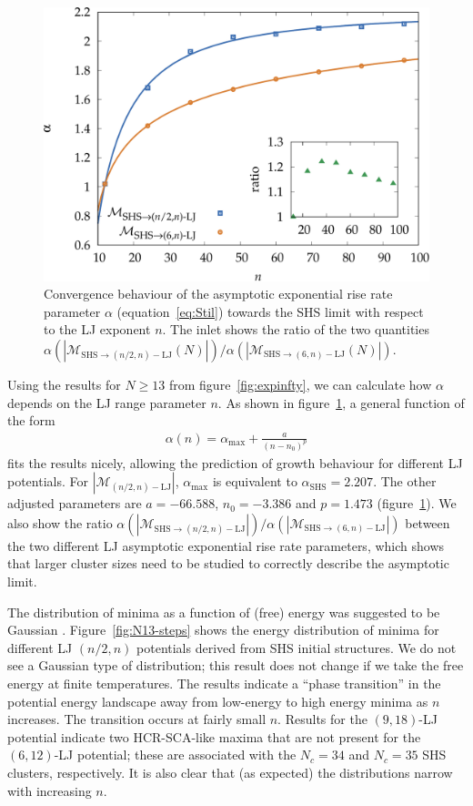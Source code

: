 \begin{figure}
    \centering
    \includegraphics[width=0.8\columnwidth]{kslj/repulsive13-14.pdf}
    \caption{Convergence behaviour of the asymptotic exponential rise rate
    parameter $\alpha$ (equation~\eqref{eq:Stil}) towards the \acs{SHS} limit with
    respect to the \acs{LJ} exponent $n$. The inlet shows the ratio of the two
    quantities $\alpha(|\mathcal{M}_{\text{SHS}\to (n/2,n)-\text{LJ}}(N)|)
    / \alpha(|\mathcal{M}_{\text{SHS}\to (6,n)-\text{LJ}}(N)|)$.}
    \label{fig:repulsive13-14}
\end{figure}


Using the results for $N \geq 13$ from figure~\ref{fig:expinfty}, we can
calculate how $\alpha$ depends on the LJ range parameter $n$.  As shown in
figure~\ref{fig:repulsive13-14}, a general function of the form
\begin{align}
\label{expgrowth}
    \alpha(n)=\alpha_\text{max}+\frac{a}{(n-n_0)^{p}}
\end{align}
fits the results nicely, allowing the prediction of growth behaviour for different
LJ potentials. For $|\mathcal{M}_{(n/2,n)-\text{LJ}}|$, $\alpha_\text{max}$ is
equivalent to $\alpha_\text{SHS}=2.207$. The other adjusted parameters are
$a=-66.588$, $n_0=-3.386$ and $p=1.473$ (figure~\ref{fig:repulsive13-14}).
We also show the ratio $\alpha(|\mathcal{M}_{\text{SHS}\to (n/2,n)-\text{LJ}}|) /
	\alpha(|\mathcal{M}_{\text{SHS}\to (6,n)-\text{LJ}}|)$ between the two 
	different LJ asymptotic exponential rise rate parameters, which shows that larger
	cluster sizes need to be studied to correctly describe the asymptotic limit. 


The distribution of minima as a function of (free) energy was suggested to be
Gaussian \autocite{Sciortino-1999}. Figure~\ref{fig:N13-steps} shows the energy
distribution of minima for different LJ $(n/2,n)$ potentials derived from \ac{SHS}
initial structures. We do not see a Gaussian type of distribution; this 
result does not change if we take the free energy at finite temperatures. 
The results indicate a ``phase transition'' in the potential energy landscape away from low-energy to
high energy minima as $n$ increases.
The transition occurs at fairly small $n$. 
Results for the $(9,18)$-LJ potential indicate two HCR-SCA-like maxima that are not present for the $(6,12)$-LJ potential; these are associated with the $N_c = 34$ and $N_c = 35$ \ac{SHS} clusters,
respectively.
It is also clear that (as expected) the distributions narrow with increasing $n$.

